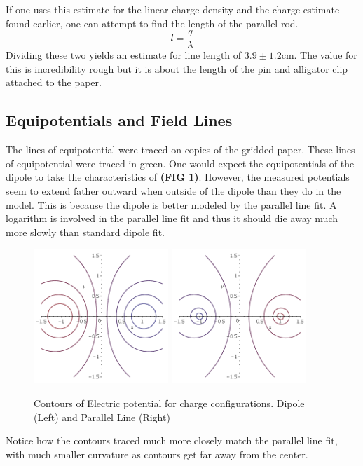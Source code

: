 \documentclass[11pt]{article}
\begin{document}
If one uses this estimate for the linear charge density and the charge estimate found earlier, one can attempt to find the length of the parallel rod.
\begin{equation}
l = \frac{q}{\lambda}
\end{equation}
Dividing these two yields an estimate for line length of \(3.9 \pm 1.2 \)cm. The value for this is incredibility rough but it is about the length of the pin and alligator clip attached to the paper.

\subsection{Equipotentials and Field Lines}
The lines of equipotential were traced on copies of the gridded paper. These lines of equipotential were traced in green. One would expect the equipotentials of the dipole to take the characteristics of \textbf{(FIG 1)}. However, the measured potentials seem to extend father outward when outside of the dipole than they do in the model. This is because the dipole is better modeled by the parallel line fit. A logarithm is involved in the parallel line fit and thus it should die away much more slowly than standard dipole fit.
\begin{figure}[h]
	\begin{center}
		\includegraphics[width=2in]{cont}
		\includegraphics[width=2in]{ln}
	\end{center}
	\caption{ Contours of Electric potential for charge configurations. Dipole (Left) and Parallel Line (Right)}
\end{figure}
Notice how the contours traced much more closely match the parallel line fit, with much smaller curvature as contours get far away from the center.
\end{document}
